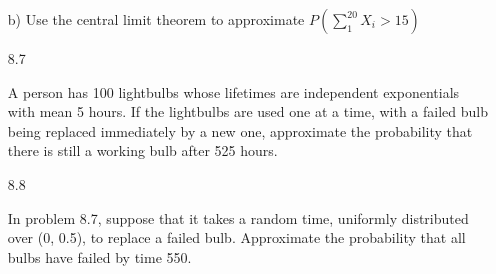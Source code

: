 \documentclass[11pt]{article}
\begin{document}
\begin{itemize}
		b) Use the central limit theorem to approximate
		$P(\sum_1^{20} X_i > 15)$

	\item[8.7]

		A person has 100 lightbulbs whose lifetimes are 
		independent exponentials with mean 5 hours.
		If the lightbulbs are used one at a time, with
		a failed bulb being replaced immediately by a new one,
		approximate the probability that there is still a
		working bulb after 525 hours.

	\item[8.8]

		In problem 8.7, suppose that it takes a random time,
		uniformly distributed over (0, 0.5), to replace a 
		failed bulb. Approximate the probability that all bulbs
		have failed by time 550.

\end{itemize}
\end{document}
